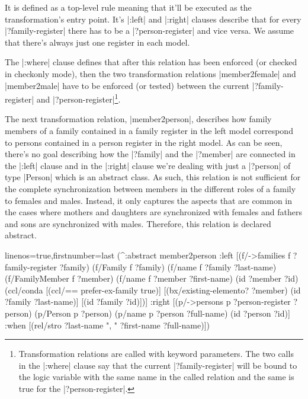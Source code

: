 \documentclass[a4paper]{article}
\newcommand{\code}{\clojureinline}
\begin{document}
It is defined as a top-level rule meaning that it'll be executed as the
transformation's entry point.  It's \code|:left| and \code|:right| clauses
describe that for every \code|?family-register| there has to be a
\code|?person-register| and vice versa.  We assume that there's always just one
register in each model.

The \code|:where| clause defines that after this relation has been enforced (or
checked in checkonly mode), then the two transformation relations
\code|member2female| and \code|member2male| have to be enforced (or tested)
between the current \code|?family-register| and
\code|?person-register|\footnote{Transformation relations are called with
  keyword parameters.  The two calls in the \code|:where| clause say that the
  current \code|?family-register| will be bound to the logic variable with the
  same name in the called relation and the same is true for the
  \code|?person-register|.}.

The next transformation relation, \code|member2person|, describes how family
members of a family contained in a family register in the left model correspond
to persons contained in a person register in the right model.  As can be seen,
there's no goal describing how the \code|?family| and the \code|?member| are
connected in the \code|:left| clause and in the \code|:right| clause we're
dealing with just a \code|?person| of type \code|Person| which is an abstract
class.  As such, this relation is not sufficient for the complete
synchronization between members in the different roles of a family to females
and males.  Instead, it only captures the aspects that are common in the cases
where mothers and daughters are synchronized with females and fathers and sons
are synchronized with males.  Therefore, this relation is declared abstract.

\begin{clojurecode*}{linenos=true,firstnumber=last}
  (^:abstract member2person
   :left  [(f/->families f ?family-register ?family)
           (f/Family f ?family)
           (f/name f ?family ?last-name)
           (f/FamilyMember f ?member)
           (f/name f ?member ?first-name)
           (id ?member ?id)
           (ccl/conda
            [(ccl/== prefer-ex-family true)]
            [(bx/existing-elemento? ?member)
             (id ?family ?last-name)]
            [(id ?family ?id)])]
   :right [(p/->persons p ?person-register ?person)
           (p/Person p ?person)
           (p/name p ?person ?full-name)
           (id ?person ?id)]
   :when  [(rel/stro ?last-name ", " ?first-name ?full-name)])
\end{clojurecode*}
\end{document}
